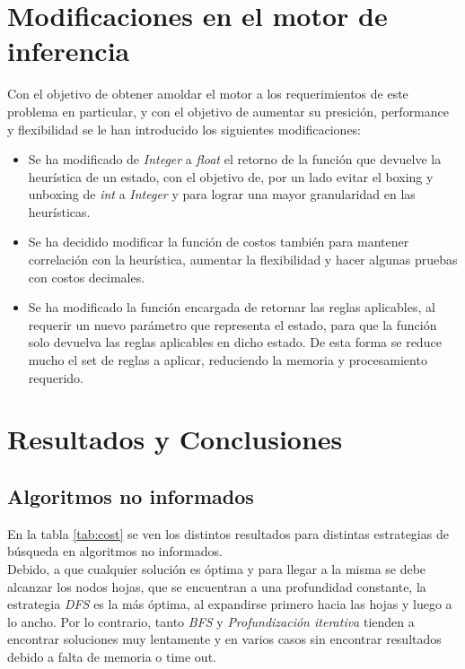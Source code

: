 \documentclass{sig-alternate}
\begin{document}
\section*{Modificaciones en el motor de inferencia}
Con el objetivo de obtener amoldar el motor a los requerimientos de este problema en particular, y con el objetivo de aumentar su presici\'on, performance y flexibilidad se  le han introducido los siguientes modificaciones:
\begin{itemize}
	\item Se ha modificado de \emph{Integer} a \emph{float} el retorno de la funci\'on que devuelve la heur\'istica de un estado, con el objetivo de, por un lado evitar el boxing y unboxing de \emph{int} a \emph{Integer} y para lograr una mayor granularidad en las heur\'isticas.
	\item Se ha decidido modificar la funci\'on de costos tambi\'en para mantener correlaci\'on con la heur\'istica, aumentar la flexibilidad y hacer algunas pruebas con costos decimales.
	\item Se ha modificado la funci\'on encargada de retornar las reglas aplicables, al requerir un nuevo par\'ametro que representa el estado, para que la funci\'on solo devuelva las reglas aplicables en dicho estado. De esta forma se reduce mucho el set de reglas a aplicar, reduciendo la memoria y procesamiento requerido.
	\end{itemize}

\section*{Resultados y Conclusiones}
\subsection*{Algoritmos no informados}	
En la tabla \ref{tab:cost} se ven los distintos resultados para distintas estrategias de b\'usqueda	 en algoritmos no informados. \\
Debido, a que cualquier soluci\'on es \'optima y para llegar a la misma se debe alcanzar los nodos hojas, que se encuentran a una profundidad constante, la estrategia  \emph{DFS} es la m\'as \'optima, al expandirse primero hacia las hojas y luego a lo ancho. Por lo contrario, tanto \emph{BFS} y \emph{Profundizaci\'on iterativa} tienden a encontrar soluciones muy lentamente y en varios casos sin encontrar resultados debido a falta de memoria o time out. \\
\end{document}
